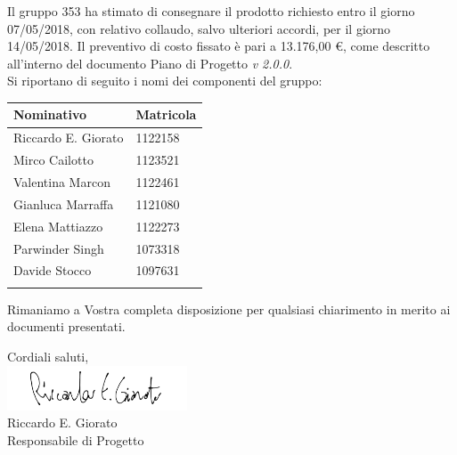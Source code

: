 \documentclass[openany, a4paper, 12pt]{letter}
\newcommand{\Valentina}{Valentina Marcon\xspace}
\newcommand{\Mirco}{Mirco Cailotto\xspace}
\newcommand{\Riccardo}{Riccardo E. Giorato\xspace}
\newcommand{\Davide}{Davide Stocco\xspace}
\newcommand{\Parwinder}{Parwinder Singh\xspace}
\newcommand{\Elena}{Elena Mattiazzo\xspace}
\newcommand{\Gianluca}{Gianluca Marraffa\xspace}
\newcommand{\vrdue}{\textit{v 2.0.0}\xspace} %
\begin{document}
\begin{letter}
		
		Il gruppo 353 ha stimato di consegnare il prodotto richiesto entro il giorno 07/05/2018,
		con relativo collaudo, salvo ulteriori accordi, per il giorno 14/05/2018. Il preventivo di costo
		fissato è pari a 13.176,00 \euro, come descritto all'interno del documento Piano di Progetto \vrdue.
		\medskip \\
		Si riportano di seguito i nomi dei componenti del gruppo:\\
		
		\renewcommand*{\arraystretch}{1.2}
		\begin{longtable}[H]{p{6cm}p{2.5cm}}
			\rowcolor{CHeader}   
			\color{CHeaderText} \textbf{Nominativo} & \color{CHeaderText} \textbf{Matricola}\\
			\endhead
			\Riccardo & 1122158 \\
			\Mirco & 1123521 \\
			\Valentina &  1122461 \\
			\Gianluca & 1121080 \\
			\Elena & 1122273 \\
			\Parwinder & 1073318 \\
			\Davide & 1097631 \\
			\hiderowcolors
		\end{longtable}
		
		Rimaniamo a Vostra completa disposizione per qualsiasi chiarimento in merito ai documenti presentati.
		\begin{flushleft}
			Cordiali saluti,\\
			\includegraphics[width=0.4\textwidth]{firmaResp}\\
			\Riccardo \\
			Responsabile di Progetto\\
		\end{flushleft}
	\end{letter}
\end{document}
